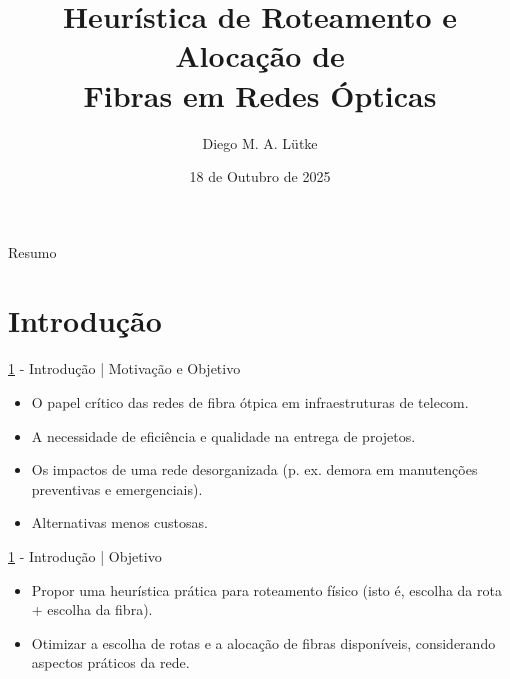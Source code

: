 \documentclass[aspectratio=169,xcolor=dvipsnames]{beamer}
\title{Heurística de Roteamento e Alocação de \\ Fibras em Redes Ópticas}
\author{Diego M. A. Lütke}
\institute
{
    Escola Politécnica \\
    Pontifícia Universidade Católica do Paraná
}
\date{18 de Outubro de 2025}
\begin{document}
\begin{frame}
    \titlepage
\end{frame}

\begin{frame}{Resumo}
    \tableofcontents
\end{frame}

\section{Introdução}\label{sec:introducao}
\begin{frame}{\ref{sec:introducao} - Introdução | Motivação e Objetivo}
  \begin{itemize}
    \item O papel crítico das redes de fibra ótpica em infraestruturas de telecom.
    \item A necessidade de eficiência e qualidade na entrega de projetos.
    \item Os impactos de uma rede desorganizada (p. ex. demora em manutenções preventivas e emergenciais).
    \item Alternativas menos custosas.
  \end{itemize}
\end{frame}

\begin{frame}{\ref{sec:introducao} - Introdução | Objetivo}
  \begin{itemize}
    \item Propor uma heurística prática para roteamento físico (isto é, escolha da rota + escolha da fibra).
    \item Otimizar a escolha de rotas e a alocação de fibras disponíveis, considerando aspectos práticos da rede.
  \end{itemize}
\end{frame}
\end{document}
